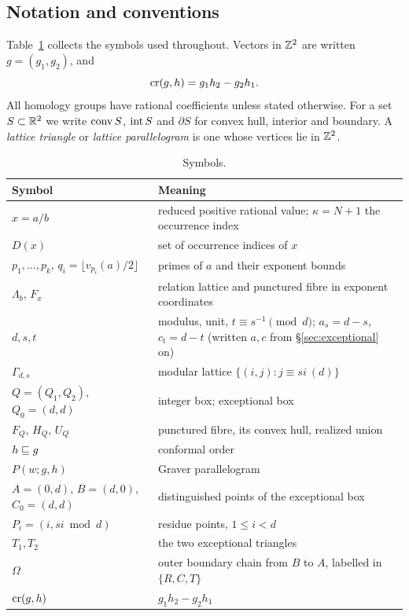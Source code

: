 \subsection{Notation and conventions}

Table~\ref{tab:notation} collects the symbols used throughout. Vectors in $\mathbb Z^2$ are written $g=(g_1,g_2)$, and
\[
  \operatorname{cr}(g,h)=g_1h_2-g_2h_1.
\]
All homology groups have rational coefficients unless stated otherwise. For a set $S\subset\mathbb R^2$ we write $\operatorname{conv} S$, $\operatorname{int} S$ and $\partial S$ for convex hull, interior and boundary. A \emph{lattice triangle} or \emph{lattice parallelogram} is one whose vertices lie in $\mathbb Z^2$.

\begin{table}[ht]
\centering\small
\begin{tabular}{@{}p{4.6cm}p{10.4cm}@{}}
\toprule
Symbol & Meaning\\
\midrule
$x=a/b$ & reduced positive rational value; $\kappa=N+1$ the occurrence index\\
$D(x)$ & set of occurrence indices of $x$\\
$p_1,\dots,p_k$, $q_i=\lfloor v_{p_i}(a)/2\rfloor$ & primes of $a$ and their exponent bounds\\
$\Lambda_b$, $F_x$ & relation lattice and punctured fibre in exponent coordinates\\
$d,s,t$ & modulus, unit, $t\equiv s^{-1}\pmod d$; $a_s=d-s$, $c_t=d-t$ (written $a,c$ from \S\ref{sec:exceptional} on)\\
$\Gamma_{d,s}$ & modular lattice $\{(i,j):j\equiv si\ (d)\}$\\
$Q=(Q_1,Q_2)$, $Q_0=(d,d)$ & integer box; exceptional box\\
$F_Q$, $H_Q$, $U_Q$ & punctured fibre, its convex hull, realized union\\
$h\sqsubseteq g$ & conformal order\\
$P(w;g,h)$ & Graver parallelogram\\
$A=(0,d)$, $B=(d,0)$, $C_0=(d,d)$ & distinguished points of the exceptional box\\
$P_i=(i,si\bmod d)$ & residue points, $1\le i<d$\\
$T_1,T_2$ & the two exceptional triangles\\
$\Omega$ & outer boundary chain from $B$ to $A$, labelled in $\{R,C,T\}$\\
$\operatorname{cr}(g,h)$ & $g_1h_2-g_2h_1$\\
\bottomrule
\end{tabular}
\caption{Symbols.}\label{tab:notation}
\end{table}

